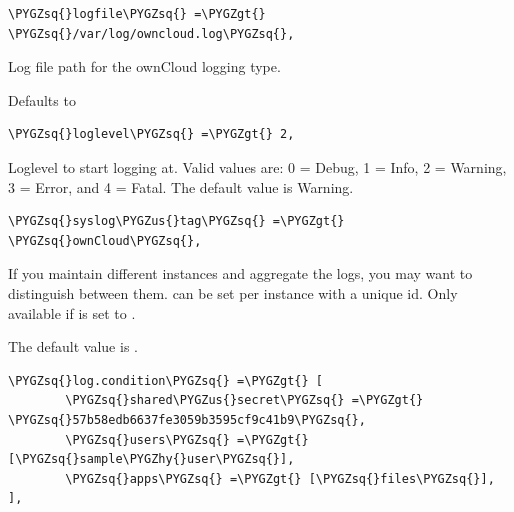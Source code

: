 \documentclass[letterpaper,10pt,english]{sphinxmanual}
\def\PYGZus{\char`\_}
\def\PYGZgt{\char`\>}
\def\PYGZhy{\char`\-}
\def\PYGZsq{\char`\'}
\renewcommand\PYGZsq{\textquotesingle}
\begin{document}
\begin{Verbatim}[commandchars=\\\{\}]
\PYGZsq{}logfile\PYGZsq{} =\PYGZgt{} \PYGZsq{}/var/log/owncloud.log\PYGZsq{},
\end{Verbatim}

Log file path for the ownCloud logging type.

Defaults to 

\begin{Verbatim}[commandchars=\\\{\}]
\PYGZsq{}loglevel\PYGZsq{} =\PYGZgt{} 2,
\end{Verbatim}

Loglevel to start logging at. Valid values are: 0 = Debug, 1 = Info, 2 =
Warning, 3 = Error, and 4 = Fatal. The default value is Warning.

\begin{Verbatim}[commandchars=\\\{\}]
\PYGZsq{}syslog\PYGZus{}tag\PYGZsq{} =\PYGZgt{} \PYGZsq{}ownCloud\PYGZsq{},
\end{Verbatim}

If you maintain different instances and aggregate the logs, you may want
to distinguish between them.  can be set per instance
with a unique id. Only available if  is set to .

The default value is .

\begin{Verbatim}[commandchars=\\\{\}]
\PYGZsq{}log.condition\PYGZsq{} =\PYGZgt{} [
        \PYGZsq{}shared\PYGZus{}secret\PYGZsq{} =\PYGZgt{} \PYGZsq{}57b58edb6637fe3059b3595cf9c41b9\PYGZsq{},
        \PYGZsq{}users\PYGZsq{} =\PYGZgt{} [\PYGZsq{}sample\PYGZhy{}user\PYGZsq{}],
        \PYGZsq{}apps\PYGZsq{} =\PYGZgt{} [\PYGZsq{}files\PYGZsq{}],
],
\end{Verbatim}
\end{document}
